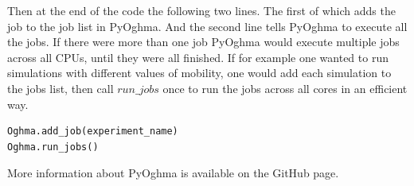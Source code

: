Then at the end of the code the following two lines. The first of which adds the job to the job list in PyOghma. And the second line tells PyOghma to execute all the jobs. If there were more than one job PyOghma would execute multiple jobs across all CPUs, until they were all finished. If for example one wanted to run simulations with different values of mobility, one would add each simulation to the jobs list, then call $run\_jobs$ once to run the jobs across all cores in an efficient way.

\begin{listing}[H]
\begin{verbatim}
Oghma.add_job(experiment_name)
Oghma.run_jobs()
\end{verbatim}
\end{listing}



More information about PyOghma is available on the GitHub page.
